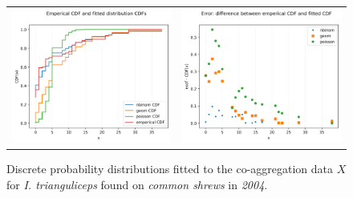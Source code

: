 \documentclass{article}
\begin{document}
\begin{figure}[h!]
	\centering
	\begin{tabular}{ll}
		\includegraphics[width=.48\linewidth,valign=m]{CDF_compare_2004_I.trianguliceps_SA} & \includegraphics[width=.48\linewidth,valign=m]{CDF_errors_2004_I.trianguliceps_SA}
	\end{tabular}
	\caption{Discrete probability distributions fitted to the co-aggregation data $ X $ for \textit{I. trianguliceps} found on \textit{common shrews} in \textit{2004}.}
	\label{fig:kielder_2004_itrianguliceps_SA}
\end{figure}
\end{document}
